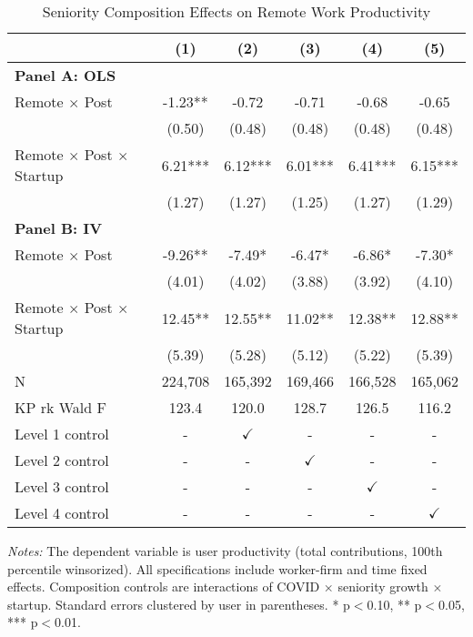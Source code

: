\documentclass[11pt]{article}
\begin{document}
\begin{table}[H]
\centering
\caption{Seniority Composition Effects on Remote Work Productivity}
\label{tab:seniority_composition}
\begin{tabular}{l*{5}{c}}
\toprule
 & (1) & (2) & (3) & (4) & (5) \\
\midrule
\multicolumn{6}{l}{\textbf{Panel A: OLS}} \\
\addlinespace
Remote $\times$ Post & -1.23** & -0.72 & -0.71 & -0.68 & -0.65 \\
 & (0.50) & (0.48) & (0.48) & (0.48) & (0.48) \\
\addlinespace[0.5em]
Remote $\times$ Post $\times$ Startup & 6.21*** & 6.12*** & 6.01*** & 6.41*** & 6.15*** \\
 & (1.27) & (1.27) & (1.25) & (1.27) & (1.29) \\

\midrule
\multicolumn{6}{l}{\textbf{Panel B: IV}} \\
\addlinespace
Remote $\times$ Post & -9.26** & -7.49* & -6.47* & -6.86* & -7.30* \\
 & (4.01) & (4.02) & (3.88) & (3.92) & (4.10) \\
\addlinespace[0.5em]
Remote $\times$ Post $\times$ Startup & 12.45** & 12.55** & 11.02** & 12.38** & 12.88** \\
 & (5.39) & (5.28) & (5.12) & (5.22) & (5.39) \\

\midrule
N & 224,708 & 165,392 & 169,466 & 166,528 & 165,062 \\
KP rk Wald F & 123.4 & 120.0 & 128.7 & 126.5 & 116.2 \\

\midrule
Level 1 control & - & $\checkmark$ & - & - & - \\
Level 2 control & - & - & $\checkmark$ & - & - \\
Level 3 control & - & - & - & $\checkmark$ & - \\
Level 4 control & - & - & - & - & $\checkmark$ \\
\bottomrule
\end{tabular}
\begin{tablenotes}
\small
\item \textit{Notes:} The dependent variable is user productivity (total contributions, 100th percentile winsorized). 
All specifications include worker-firm and time fixed effects. 
Composition controls are interactions of COVID $\times$ seniority growth $\times$ startup.
Standard errors clustered by user in parentheses. 
* p$<$0.10, ** p$<$0.05, *** p$<$0.01.
\end{tablenotes}
\end{table}
\end{document}
